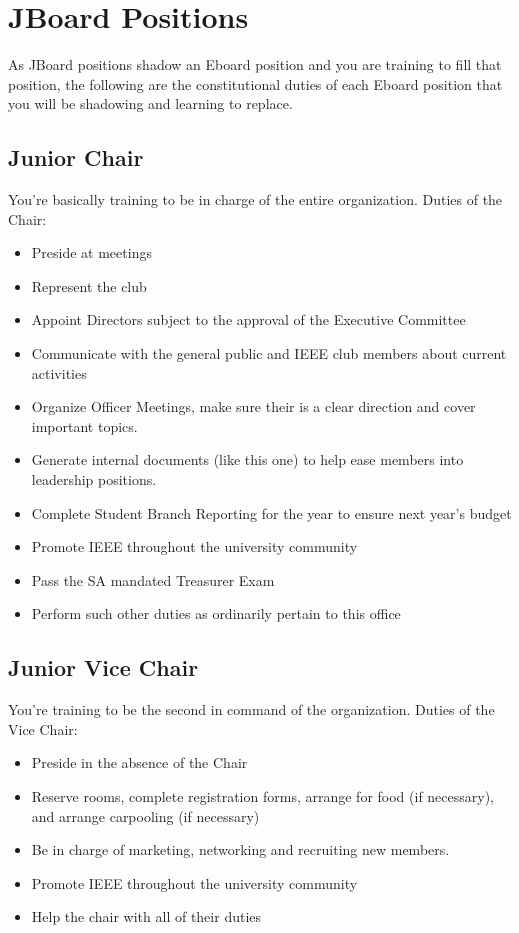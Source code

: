 \documentclass{article}
\begin{document}
\newpage

\section{JBoard Positions} \label{jbp}
As JBoard positions shadow an Eboard position and you are training to fill that position, the following are the constitutional duties of each Eboard position that you will be shadowing and learning to replace. 

\subsection{Junior Chair} 
You're basically training to be in charge of the entire organization.
\newline
\newline
Duties of the Chair:
\begin{itemize}
    \item Preside at meetings  
    \item Represent the club  
    \item Appoint Directors subject to the approval of the Executive Committee
    \item Communicate with the general public and IEEE club members about current activities
    \item Organize Officer Meetings, make sure their is a clear direction and cover important topics.
    \item Generate internal documents (like this one) to help ease members into leadership positions.  
    \item Complete Student Branch Reporting for the year to ensure next year’s budget 
    \item Promote IEEE throughout the university community 
    \item Pass the SA mandated Treasurer Exam
    \item Perform such other duties as ordinarily pertain to this office  
\end{itemize}

\subsection{Junior Vice Chair}
You're training to be the second in command of the organization.
\newline
\newline
Duties of the Vice Chair:
\begin{itemize}
    \item Preside in the absence of the Chair   
    \item Reserve rooms, complete registration forms, arrange for food (if necessary), and arrange carpooling (if necessary) 
    \item Be in charge of marketing, networking and recruiting new members.
    \item Promote IEEE throughout the university community 
    \item Help the chair with all of their duties
\end{itemize}
\end{document}
